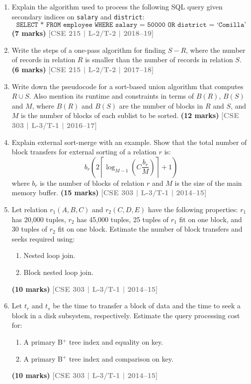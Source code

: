 \documentclass[12pt]{article}
\newcommand{\yr}[1]{\hfill\textcolor{gray}{\small\textbf{[#1]}}}
\newcommand{\mk}[1]{\textcolor{orange!70!black}{\small\textbf{(#1 marks)}}}
\begin{document}
\begin{enumerate}
\item Explain the algorithm used to process the following SQL query given secondary indices on \texttt{salary} and \texttt{district}:
\[\texttt{SELECT * FROM employee WHERE salary = 50000 OR district = `Comilla'}\]
\mk{7} \yr{CSE 215 | L-2/T-2 | 2018--19}


\item Write the steps of a one-pass algorithm for finding $S - R$, where the number of records in relation $R$ is smaller than the number of records in relation $S$.
\mk{6} \yr{CSE 215 | L-2/T-2 | 2017--18}


\item Write down the pseudocode for a sort-based union algorithm that computes $R \cup S$. Also mention its runtime and constraints in terms of $B(R)$, $B(S)$ and $M$, where $B(R)$ and $B(S)$ are the number of blocks in $R$ and $S$, and $M$ is the number of blocks of each sublist to be sorted.
\mk{12} \yr{CSE 303 | L-3/T-1 | 2016--17}


\item Explain external sort-merge with an example. Show that the total number of block transfers for external sorting of a relation $r$ is:
\[b_r\!\left(2\left\lceil\log_{M-1}(C\dfrac{b_r}{M})\right\rceil + 1\right)\]
where $b_r$ is the number of blocks of relation $r$ and $M$ is the size of the main memory buffer.
\mk{15} \yr{CSE 303 | L-3/T-1 | 2014--15}


\item Let relation $r_1(A, B, C)$ and $r_2(C, D, E)$ have the following properties: $r_1$ has 20,000 tuples, $r_2$ has 45,000 tuples, 25 tuples of $r_1$ fit on one block, and 30 tuples of $r_2$ fit on one block. Estimate the number of block transfers and seeks required using:
\begin{enumerate}
  \item Nested loop join.
  \item Block nested loop join.
\end{enumerate}
\mk{10} \yr{CSE 303 | L-3/T-1 | 2014--15}


\item Let $t_r$ and $t_s$ be the time to transfer a block of data and the time to seek a block in a disk subsystem, respectively. Estimate the query processing cost for:
\begin{enumerate}
  \item A primary B$^+$ tree index and equality on key.
  \item A primary B$^+$ tree index and comparison on key.
\end{enumerate}
\mk{10} \yr{CSE 303 | L-3/T-1 | 2014--15}



\end{enumerate}
\end{document}
